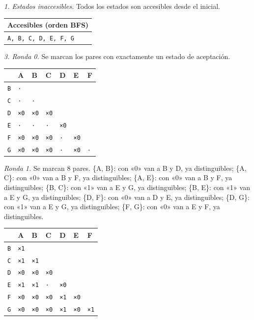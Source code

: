 \documentclass[11pt]{article}
\begin{document}
\textit{1. Estados inaccesibles.} Todos los estados son accesibles desde el inicial.
\begin{center}\footnotesize\begin{tabular}{l}\toprule
Accesibles (orden BFS) \\\midrule
\texttt{A, B, C, D, E, F, G} \\
\bottomrule\end{tabular}\end{center}
\textit{3. Ronda 0.} Se marcan los pares con exactamente un estado de aceptación.
\begin{center}\footnotesize\begin{tabular}{lllllll}\toprule
 & A & B & C & D & E & F \\\midrule
\texttt{B} & \texttt{·} & \texttt{} & \texttt{} & \texttt{} & \texttt{} & \texttt{} \\
\texttt{C} & \texttt{·} & \texttt{·} & \texttt{} & \texttt{} & \texttt{} & \texttt{} \\
\texttt{D} & \texttt{×0} & \texttt{×0} & \texttt{×0} & \texttt{} & \texttt{} & \texttt{} \\
\texttt{E} & \texttt{·} & \texttt{·} & \texttt{·} & \texttt{×0} & \texttt{} & \texttt{} \\
\texttt{F} & \texttt{×0} & \texttt{×0} & \texttt{×0} & \texttt{·} & \texttt{×0} & \texttt{} \\
\texttt{G} & \texttt{×0} & \texttt{×0} & \texttt{×0} & \texttt{·} & \texttt{×0} & \texttt{·} \\
\bottomrule\end{tabular}\end{center}
\textit{Ronda 1.} Se marcan 8 pares. \{A, B\}: con «0» van a B y D, ya distinguibles; \{A, C\}: con «0» van a B y F, ya distinguibles; \{A, E\}: con «0» van a B y F, ya distinguibles; \{B, C\}: con «1» van a E y G, ya distinguibles; \{B, E\}: con «1» van a E y G, ya distinguibles; \{D, F\}: con «0» van a D y E, ya distinguibles; \{D, G\}: con «1» van a E y G, ya distinguibles; \{F, G\}: con «0» van a E y F, ya distinguibles.
\begin{center}\footnotesize\begin{tabular}{lllllll}\toprule
 & A & B & C & D & E & F \\\midrule
\texttt{B} & \texttt{×1} & \texttt{} & \texttt{} & \texttt{} & \texttt{} & \texttt{} \\
\texttt{C} & \texttt{×1} & \texttt{×1} & \texttt{} & \texttt{} & \texttt{} & \texttt{} \\
\texttt{D} & \texttt{×0} & \texttt{×0} & \texttt{×0} & \texttt{} & \texttt{} & \texttt{} \\
\texttt{E} & \texttt{×1} & \texttt{×1} & \texttt{·} & \texttt{×0} & \texttt{} & \texttt{} \\
\texttt{F} & \texttt{×0} & \texttt{×0} & \texttt{×0} & \texttt{×1} & \texttt{×0} & \texttt{} \\
\texttt{G} & \texttt{×0} & \texttt{×0} & \texttt{×0} & \texttt{×1} & \texttt{×0} & \texttt{×1} \\
\bottomrule\end{tabular}\end{center}
\end{document}
